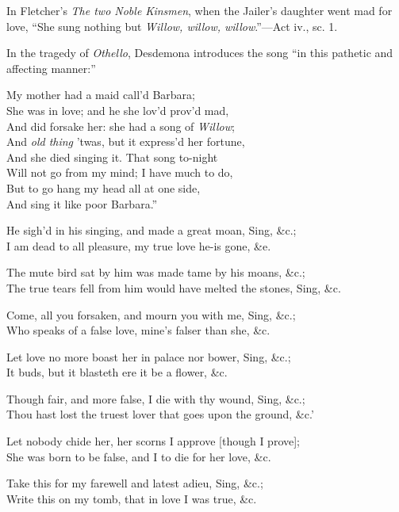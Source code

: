 In Fletcher’s \textit{The two Noble Kinsmen}, when the Jailer’s daughter went mad
for love, “She sung nothing but \textit{Willow, willow, willow}.”—Act iv., sc. 1.

In the tragedy of \textit{Othello}, Desdemona introduces the song “in this pathetic
and affecting manner:”
\pagebreak

\settowidth{\versewidth}{And did forsake her: she had a song of Willow;}
\begin{scverse}
My mother had a maid call’d Barbara;\\
She was in love; and he she lov’d prov’d mad,\\
And did forsake her: she had a song of \textit{Willow};\\
And \textit{old thing} ’twas, but it express’d her fortune,\\
And she died singing it. That song to-night\\
Will not go from my mind; I have much to do,\\
But to go hang my head all at one side,\\
And sing it like poor Barbara.”
\end{scverse}



\pagebreak

\settowidth{\versewidth}{The true tears fell from him would have melted the stones, Sing,}
\begin{scverse}
He sigh’d in his singing, and made a great moan, Sing, \&c.;\\
I am dead to all pleasure, my true love he-is gone, \&e.

The mute bird sat by him was made tame by his moans, \&c.;\\
The true tears fell from him would have melted the stones, Sing, \&c.

Come, all you forsaken, and mourn you with me, Sing, \&c.;\\
Who speaks of a false love, mine’s falser than she, \&c.

Let love no more boast her in palace nor bower, Sing, \&c.;\\
It buds, but it blasteth ere it be a flower, \&c.

Though fair, and more false, I die with thy wound, Sing, \&c.;\\
Thou hast lost the truest lover that goes upon the ground, \&c.'

Let nobody chide her, her scorns I approve [though I prove];\\
She was born to be false, and I to die for her love, \&c.

Take this for my farewell and latest adieu, Sing, \&c.;\\
Write this on my tomb, that in love I was true, \&c.
\end{scverse}

